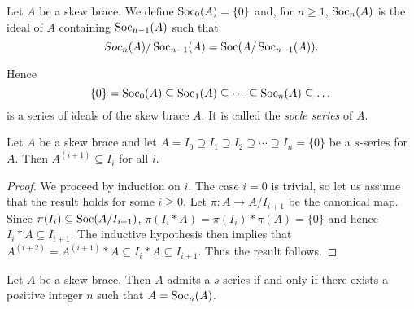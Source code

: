 


\begin{definition}
\label{defn:socle_series}
Let $A$ be a skew brace. We define
$\operatorname{Soc}_0(A)=\{0\}$ and, for $n\geq 1$, $\operatorname{Soc}_n(A)$ is the ideal of $A$
containing $\operatorname{Soc}_{n-1}(A)$ such that
\[
    Soc_n(A)/\operatorname{Soc}_{n-1}(A)=\operatorname{Soc}(A/\operatorname{Soc}_{n-1}(A)).
\]
\end{definition}

Hence
\[ \{0\}=\operatorname{Soc}_0(A)\subseteq\operatorname{Soc}_1(A)\subseteq\dots\subseteq \operatorname{Soc}_n(A)\subseteq\dots\]
is a series of ideals of the skew brace $A$. It is called the {\em socle series} of $A$.  

\begin{lemma}
    \label{lem:socle_series}
    Let $A$ be a skew brace and let $A=I_0\supseteq I_1\supseteq
    I_2\supseteq\cdots\supseteq I_n=\{0\}$ be a $s$-series for $A$. Then
    $A^{(i+1)}\subseteq I_i$ for all $i$.
\end{lemma}

\begin{proof}
    We proceed by induction on $i$. The case $i=0$ is trivial, so let us assume
    that the result holds for some $i\geq 0$. Let $\pi\colon A\to A/I_{i+1}$ be the canonical map.
    Since $\pi(I_{i})\subseteq\operatorname{Soc}(A/I_{i+1})$,
    $\pi(I_{i}*A)=\pi(I_{i})*\pi(A)=\{0\}$ and hence $I_{i}*A\subseteq I_{i+1}$.
    The inductive hypothesis then implies that
    $A^{(i+2)}=A^{(i+1)}*A\subseteq I_{i}*A\subseteq I_{i+1}$. Thus
    the result follows.
\end{proof}

\begin{lemma}
\label{lem:socn}
Let $A$ be a skew brace. Then $A$ admits a
$s$-series if and only if there exists a positive integer $n$ such
that $A=\operatorname{Soc}_n(A)$.
\end{lemma}

